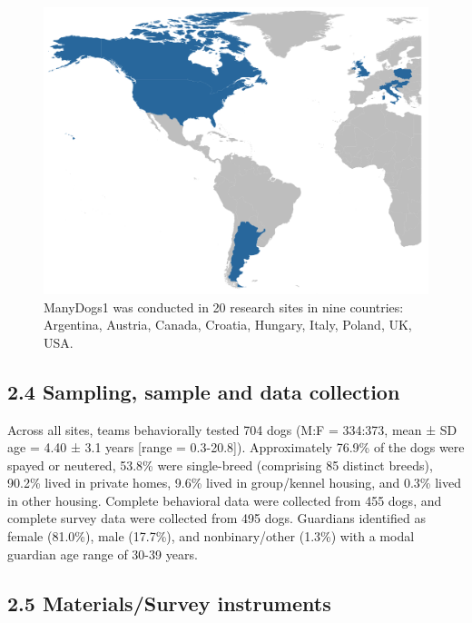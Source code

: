 \documentclass[
  pub,floatsintext]{apa6}
\begin{document}
\begin{figure}

{\centering \includegraphics[width=1\linewidth]{md1_countries} 

}

\caption{ManyDogs1 was conducted in 20 research sites in nine countries: Argentina, Austria, Canada, Croatia, Hungary, Italy, Poland, UK, USA.}\label{fig:countries}
\end{figure}

\hypertarget{sampling-sample-and-data-collection}{%
\subsection{2.4 Sampling, sample and data collection}\label{sampling-sample-and-data-collection}}

Across all sites, teams behaviorally tested 704 dogs (M:F = 334:373, mean ± SD age = 4.40 ± 3.1 years {[}range = 0.3-20.8{]}). Approximately 76.9\% of the dogs were spayed or neutered, 53.8\% were single-breed (comprising 85 distinct breeds), 90.2\% lived in private homes, 9.6\% lived in group/kennel housing, and 0.3\% lived in other housing. Complete behavioral data were collected from 455 dogs, and complete survey data were collected from 495 dogs. Guardians identified as female (81.0\%), male (17.7\%), and nonbinary/other (1.3\%) with a modal guardian age range of 30-39 years.

\hypertarget{materialssurvey-instruments}{%
\subsection{2.5 Materials/Survey instruments}\label{materialssurvey-instruments}}
\end{document}
